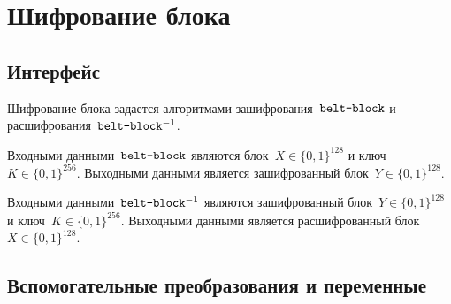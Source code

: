 \section{Шифрование блока}\label{BLOCK}

\subsection{Интерфейс}\label{BLOCK.IFace}

Шифрование блока задается алгоритмами зашифрования~$\texttt{belt-block}$
и расшифрования~$\texttt{belt-block}^{-1}$.

Входными данными~$\texttt{belt-block}$ являются блок~$X\in\{0,1\}^{128}$ 
и ключ~$K\in\{0,1\}^{256}$. 
%
Выходными данными является зашифрованный блок~$Y\in\{0,1\}^{128}$.

Входными данными~$\texttt{belt-block}^{-1}$ являются зашифрованный 
блок~$Y\in\{0,1\}^{128}$ и ключ~$K\in\{0,1\}^{256}$. 
%
Выходными данными является расшифрованный блок~$X\in\{0,1\}^{128}$.

\subsection{Вспомогательные преобразования и переменные}\label{BLOCK.Aux} 

